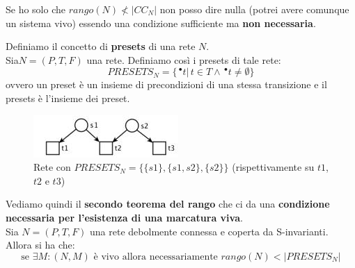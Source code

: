 \documentclass[a4paper,12pt, oneside]{book}
\begin{document}
Se ho solo che $rango(N)\not < |CC_N|$ non posso dire nulla (potrei avere
comunque un sistema vivo) essendo una condizione sufficiente ma \textbf{non
  necessaria}.
\newpage
\begin{definizione}
  Definiamo il concetto di \textbf{presets} di una rete $N$.\\
  Sia$ N = (P, T , F )$ una rete. Definiamo così i presets di tale rete:
  \[PRESETS_N=\{\,^\bullet t|\,t\in T\land \,^\bullet t\neq \emptyset\}\]
  ovvero un preset è un insieme di precondizioni di una stessa transizione e il
  presets è l'insieme dei preset.
  \begin{figure}[H]
    \centering
    \includegraphics[scale = 0.8]{img/cc6.jpg}
    \caption{Rete con $PRESETS_N=\{\{s1\},\{s1,s2\},\{s2\}\}$ (rispettivamente
      su $t1$, $t2$ e $t3$)}
  \end{figure}
\end{definizione}
\begin{teorema}
  Vediamo quindi il \textbf{secondo teorema del rango} che ci da una
  \textbf{condizione necessaria per l’esistenza di una marcatura viva}.\\ 
  Sia $N = (P, T , F )$ una rete debolmente connessa e coperta da
  S-invarianti. Allora si ha che:
  \[\mbox{se }\exists M:(N,M) \mbox{ è vivo allora necessariamente }
    rango(N)<|PRESETS_N|\]  
\end{teorema}
\end{document}
